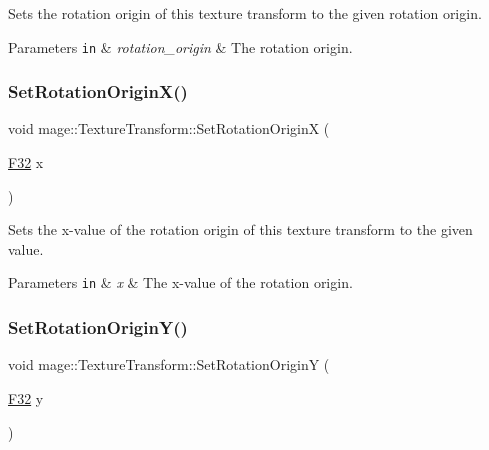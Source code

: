 Sets the rotation origin of this texture transform to the given rotation origin.


\begin{DoxyParams}[1]{Parameters}
\mbox{\tt in}  & {\em rotation\+\_\+origin} & The rotation origin. \\
\hline
\end{DoxyParams}
\mbox{\label{classmage_1_1_texture_transform_a7df3d49e14ce92fc8071f15d35018eb8}} 
\subsubsection{\texorpdfstring{Set\+Rotation\+Origin\+X()}{SetRotationOriginX()}}
{\footnotesize\ttfamily void mage\+::\+Texture\+Transform\+::\+Set\+Rotation\+OriginX (\begin{DoxyParamCaption}\item[{\mbox{\hyperlink{namespacemage_aa97e833b45f06d60a0a9c4fc22ae02c0}{F32}}}]{x }\end{DoxyParamCaption})\hspace{0.3cm}{\ttfamily [noexcept]}}

Sets the x-\/value of the rotation origin of this texture transform to the given value.


\begin{DoxyParams}[1]{Parameters}
\mbox{\tt in}  & {\em x} & The x-\/value of the rotation origin. \\
\hline
\end{DoxyParams}
\mbox{\label{classmage_1_1_texture_transform_af5808699dd47eb6672391e5725a0b7ea}} 
\subsubsection{\texorpdfstring{Set\+Rotation\+Origin\+Y()}{SetRotationOriginY()}}
{\footnotesize\ttfamily void mage\+::\+Texture\+Transform\+::\+Set\+Rotation\+OriginY (\begin{DoxyParamCaption}\item[{\mbox{\hyperlink{namespacemage_aa97e833b45f06d60a0a9c4fc22ae02c0}{F32}}}]{y }\end{DoxyParamCaption})\hspace{0.3cm}{\ttfamily [noexcept]}}

